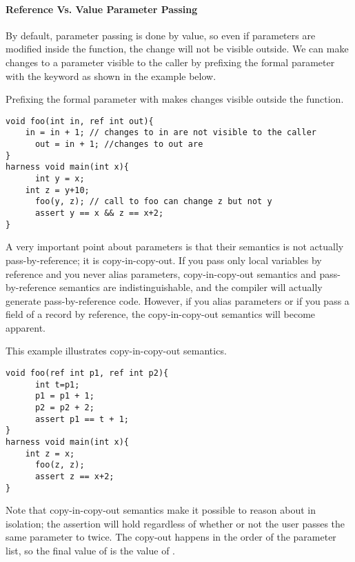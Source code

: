 

\paragraph{Reference Vs. Value Parameter Passing}
By default, parameter passing is done by value, so even if parameters are modified inside the function, the change will not be visible outside. We can make changes to a parameter visible to the caller by prefixing the formal parameter with the keyword  as shown in the example below.

\begin{Example}
Prefixing the formal parameter with  makes changes visible outside the function.
\begin{lstlisting}
void foo(int in, ref int out){
	in = in + 1; // changes to in are not visible to the caller
      out = in + 1; //changes to out are 
}
harness void main(int x){
      int y = x;
	int z = y+10;
      foo(y, z); // call to foo can change z but not y
      assert y == x && z == x+2;
}
\end{lstlisting}
\end{Example}

A very important point about  parameters is that their semantics is not actually pass-by-reference; it is copy-in-copy-out. If you pass only local variables by reference and you never alias  parameters, copy-in-copy-out semantics and pass-by-reference semantics are indistinguishable, and the compiler will actually generate pass-by-reference code. However, if you alias parameters or if you pass a field of a record by reference, the copy-in-copy-out semantics will become apparent.

\begin{Example}
This example illustrates copy-in-copy-out semantics.
\begin{lstlisting}
void foo(ref int p1, ref int p2){
      int t=p1;
      p1 = p1 + 1;
      p2 = p2 + 2;
      assert p1 == t + 1;
}
harness void main(int x){
	int z = x;
      foo(z, z); 
      assert z == x+2;
}
\end{lstlisting}
Note that copy-in-copy-out semantics make it possible to reason about  in isolation; the assertion will hold regardless of whether or not the user passes the same parameter to  twice. The copy-out happens in the order of the parameter list, so the final value of  is the value of .
\end{Example}

